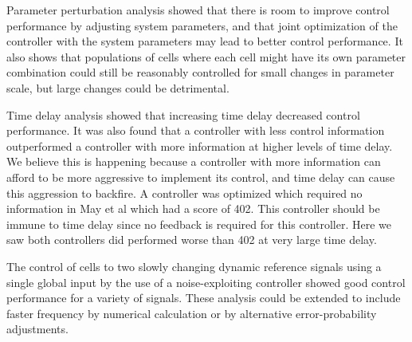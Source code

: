 \documentclass[12pt]{iopart}
\begin{document}
Parameter perturbation analysis showed that there is room to improve control performance by adjusting system parameters, and that joint optimization of the controller with the system parameters may lead to better control performance. It also shows that populations of cells where each cell might have its own parameter combination could still be reasonably controlled for small changes in parameter scale, but large changes could be detrimental.

Time delay analysis showed that increasing time delay decreased control performance. It was also found that a controller with less control information outperformed a controller with more information at higher levels of time delay. We believe this is happening because a controller with more information can afford to be more aggressive to implement its control, and time delay can cause this aggression to backfire. A controller was optimized which required no information in May et al which had a score of 402. This controller should be immune to time delay since no feedback is required for this controller. Here we saw both controllers did performed worse than 402 at very large time delay.

The control of cells to two slowly changing dynamic reference signals using a single global input by the use of a noise-exploiting controller showed good control performance for a variety of signals. These analysis could be extended to include faster frequency by numerical calculation or by alternative error-probability adjustments.
\end{document}
